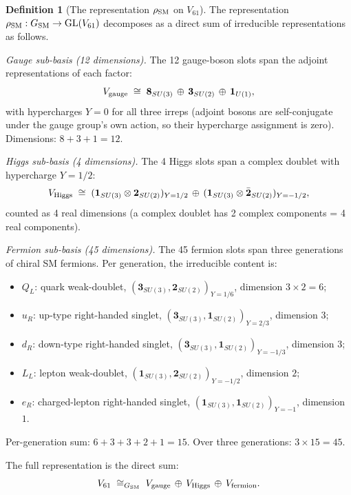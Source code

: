 \documentclass[11pt]{article}
\theoremstyle{plain}
\theoremstyle{definition}
\newtheorem{definition}[theorem]{Definition}
\theoremstyle{remark}
\begin{document}
\begin{definition}[The representation $\rho_{\rm SM}$ on $V_{61}$]\label{def:rhoSM}
The representation $\rho_{\rm SM} : G_{\rm SM} \to \mathrm{GL}(V_{61})$ decomposes as a direct sum of irreducible representations as follows.

\medskip

\emph{Gauge sub-basis (12 dimensions).}  The 12 gauge-boson slots span the adjoint representations of each factor:
\[
  V_{\rm gauge} \;\cong\; \mathbf{8}_{SU(3)} \,\oplus\, \mathbf{3}_{SU(2)} \,\oplus\, \mathbf{1}_{U(1)},
\]
with hypercharges $Y = 0$ for all three irreps (adjoint bosons are self-conjugate under the gauge group's own action, so their hypercharge assignment is zero).  Dimensions: $8 + 3 + 1 = 12$.

\medskip

\emph{Higgs sub-basis (4 dimensions).}  The 4 Higgs slots span a complex doublet with hypercharge $Y = 1/2$:
\[
  V_{\rm Higgs} \;\cong\; (\mathbf{1}_{SU(3)} \otimes \mathbf{2}_{SU(2)})_{Y=1/2} \,\oplus\, (\mathbf{1}_{SU(3)} \otimes \bar{\mathbf{2}}_{SU(2)})_{Y=-1/2},
\]
counted as 4 real dimensions (a complex doublet has 2 complex components = 4 real components).

\medskip

\emph{Fermion sub-basis (45 dimensions).}  The 45 fermion slots span three generations of chiral SM fermions.  Per generation, the irreducible content is:
\begin{itemize}[leftmargin=2em,itemsep=2pt]
  \item $Q_L$: quark weak-doublet, $(\mathbf{3}_{SU(3)}, \mathbf{2}_{SU(2)})_{Y=1/6}$, dimension $3 \times 2 = 6$;
  \item $u_R$: up-type right-handed singlet, $(\mathbf{3}_{SU(3)}, \mathbf{1}_{SU(2)})_{Y=2/3}$, dimension $3$;
  \item $d_R$: down-type right-handed singlet, $(\mathbf{3}_{SU(3)}, \mathbf{1}_{SU(2)})_{Y=-1/3}$, dimension $3$;
  \item $L_L$: lepton weak-doublet, $(\mathbf{1}_{SU(3)}, \mathbf{2}_{SU(2)})_{Y=-1/2}$, dimension $2$;
  \item $e_R$: charged-lepton right-handed singlet, $(\mathbf{1}_{SU(3)}, \mathbf{1}_{SU(2)})_{Y=-1}$, dimension $1$.
\end{itemize}
Per-generation sum: $6 + 3 + 3 + 2 + 1 = 15$.  Over three generations: $3 \times 15 = 45$.

\medskip

The full representation is the direct sum:
\[
  V_{61} \;\cong_{G_{\rm SM}}\; V_{\rm gauge} \,\oplus\, V_{\rm Higgs} \,\oplus\, V_{\rm fermion}.
\]
\end{definition}
\end{document}
